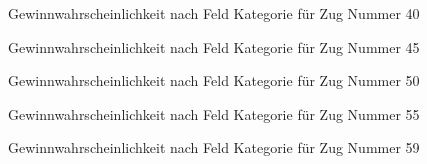 \begin{figure}[ht]
\centering
{}
\caption{Gewinnwahrscheinlichkeit nach Feld Kategorie für Zug Nummer 40}
\label{fig:win-pro-turn-40}
\end{figure}
\begin{figure}[ht]
\centering
{}
\caption{Gewinnwahrscheinlichkeit nach Feld Kategorie für Zug Nummer 45}
\label{fig:win-pro-turn-45}
\end{figure}
\begin{figure}[ht]
\centering
{}
\caption{Gewinnwahrscheinlichkeit nach Feld Kategorie für Zug Nummer 50}
\label{fig:win-pro-turn-50}
\end{figure}
\begin{figure}[ht]
\centering
{}
\caption{Gewinnwahrscheinlichkeit nach Feld Kategorie für Zug Nummer 55}
\label{fig:win-pro-turn-55}
\end{figure}
\begin{figure}[ht]
\centering
{}
\caption{Gewinnwahrscheinlichkeit nach Feld Kategorie für Zug Nummer 59}
\label{fig:win-pro-turn-59}
\end{figure}